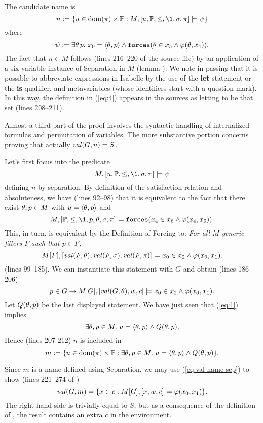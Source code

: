The candidate name is
\begin{equation}\label{eq:4}
n \defi \{u \in\dom(\pi)\times\PP :M,[u,\PP,\leq,\1,\sig,\pi]\models \psi\}
\end{equation}
where
\[
\psi \mathrel{\mathop:}= \exists \theta\, p.\ x_0=\langle\theta,p\rangle \wedge 
   \mathop{\mathtt{forces}}(\theta\in x_5\wedge\varphi(\theta,x_4)).
\]
The fact that $n\in M$ follows (lines 216--220 of the source file) by
an application of a six-variable instance of Separation in $M$ (lemma
). We note in
passing that it is possible to  abbreviate expressions in Isabelle by
the use of the  \textbf{let} statement or the \textbf{is} qualifier,
and metavariables (whose
identifiers start with a question mark). In this way, the definition in
(\ref{eq:4}) appears in the sources as letting  to be that
set (lines 208--211).

Almost a third part of the proof involves the syntactic handling of
internalized formulas and permutation of variables. The more
substantive portion concerns proving that actually $\operatorname{\mathit{val}}(G,n)=S$.

Let's first focus into the predicate 
\begin{equation}\label{eq:1}
M,[u,\PP,\leq,\1,\sig,\pi]\models \psi
\end{equation}
defining $n$ by separation. By definition of the satisfaction
relation and %
absoluteness, we have (lines 92--98) that it is equivalent to the fact
that there exist $\theta,p\in M$ with   $u=\langle\theta,p\rangle$  and 
\[
M,[\PP,\leq,\1,p,\th,\sig,\pi]\models \forceisa(x_4\in
x_6\y\phi(x_4,x_5)). 
\]
This, in turn, is equivalent by the Definition of Forcing to: \emph{For all $M$-generic
filters $F$ such that $p\in F$,} 
\begin{equation}\label{eq:2}
M[F],[\val(F,\th),\val(F,\sig),\val(F,\pi)]\models x_0\in
x_2\y\phi(x_0,x_1). 
\end{equation}
(lines 99--185). We can instantiate this statement with $G$ and obtain
(lines 186--206)
\[
p\in G \rightarrow M[G],[\operatorname{\mathit{val}}(G,\theta),w,c]\models x_0\in
x_2\wedge\varphi(x_0,x_1). 
\] 
Let $Q(\theta,p)$ be the last displayed statement. We have just seen that
(\ref{eq:1}) implies 
\[
\exists \theta,p\in M.\ u=\langle\theta,p\rangle \wedge Q(\theta,p).
\]
Hence (lines 207-212) $n$ is included in 
\[
m\mathrel{\mathop:}= \{u \in\operatorname{dom}(\pi)\times\mathbb{P} : \exists \theta,p\in M.\ u=\langle\theta,p\rangle
\wedge Q(\theta,p)\}. 
\]

Since $m$ is a name defined using Separation, we may use
(\ref{eq:val-name-sep}) to show (lines 221--274 of
)
\begin{equation}
  \label{eq:val-of-m}
  \val(G,m) = \{x\in c : M[G],[x,w,c]\models \phi(x_0,x_1)\}.
\end{equation}
The right-hand side is trivially equal to $S$, but as a consequence of
the definition of 
, the result contains an extra $c$ in the
environment.

